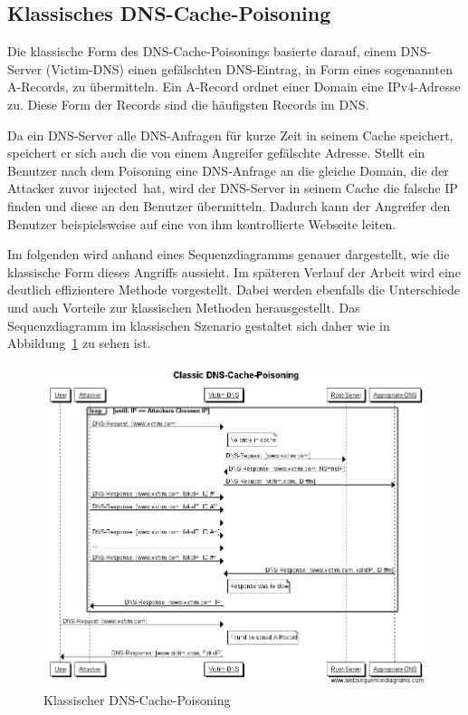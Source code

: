 \documentclass[10pt,a4paper]{article}
\begin{document}
\subsection{Klassisches DNS-Cache-Poisoning}
Die klassische Form des DNS-Cache-Poisonings basierte darauf, einem DNS-Server (Victim-DNS) einen gefälschten DNS-Eintrag, in Form eines sogenannten A-Records, zu übermitteln. Ein A-Record ordnet einer Domain eine  IPv4-Adresse zu. Diese Form der Records sind die häufigsten Records im DNS. 

Da ein DNS-Server alle DNS-Anfragen für kurze Zeit in seinem Cache speichert, speichert er sich auch die von einem Angreifer gefälschte Adresse. Stellt ein Benutzer nach dem Poisoning eine DNS-Anfrage an die gleiche Domain, die der Attacker zuvor \glqq injected\grqq\ hat, wird der DNS-Server in seinem Cache die falsche IP finden und diese an den Benutzer übermitteln. Dadurch kann der Angreifer den Benutzer beispielsweise auf eine von ihm kontrollierte Webseite leiten. 

Im folgenden wird anhand eines Sequenzdiagramms genauer dargestellt, wie die klassische Form dieses Angriffs aussieht. Im späteren Verlauf der Arbeit wird eine deutlich effizientere Methode vorgestellt. Dabei werden ebenfalls die Unterschiede und auch Vorteile zur klassischen Methoden herausgestellt. Das Sequenzdiagramm im klassischen Szenario gestaltet sich daher wie in Abbildung~\ref{pic:CDNSCP} zu sehen ist.
\begin{figure}[h]
	\centering
	\includegraphics[scale=0.45]{Classic_DNS-Cache-Poisoning.png}
	\caption{Klassischer DNS-Cache-Poisoning}
	\label{pic:CDNSCP}
\end{figure}
\end{document}
